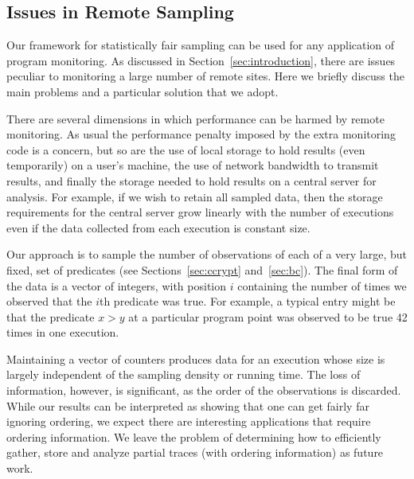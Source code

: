 \subsection{Issues in Remote Sampling}
\label{sec:compression}

Our framework for statistically fair sampling can be used for any
application of program monitoring.  As discussed in
Section~\ref{sec:introduction}, there are issues peculiar to
monitoring a large number of remote sites.  Here we briefly discuss
the main problems and a particular solution that we adopt.

There are several dimensions in which performance can be harmed by
remote monitoring.  As usual the performance penalty imposed by the
extra monitoring code is a concern, but so are the use of local
storage to hold results (even temporarily) on a user's machine, the
use of network bandwidth to transmit results, and finally the storage
needed to hold results on a central server for analysis.  For example,
if we wish to retain all sampled data, then the storage requirements for the
central server grow linearly with the number of executions even if the
data collected from each execution is constant size.  

Our approach is to sample the number of observations of each of a very
large, but fixed, set of predicates (see Sections~\ref{sec:ccrypt}
and~\ref{sec:bc}).  The final form of the data is a vector of
integers, with position $i$ containing the number of times we observed
that the $i$th predicate was true.  For example, a typical entry might
be that the predicate $x > y$ at a particular program point was
observed to be true 42 times in one execution.

Maintaining a vector of counters produces data for an execution whose
size is largely independent of the sampling density or running time.
The loss of information, however, is significant, as the order
of the observations is discarded.  While our results can be interpreted
as showing that one can get fairly far ignoring ordering, we expect
there are interesting applications that require ordering information.
We leave the problem of determining how to efficiently gather, store and
analyze partial traces (with ordering information) as future work.

